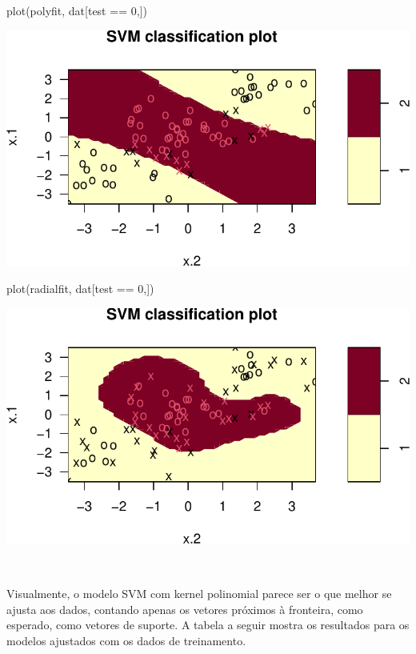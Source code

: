 \documentclass[
  a4paperpaper,
]{article}
\newenvironment{Shaded}{\begin{snugshade}}{\end{snugshade}}
\newcommand{\DecValTok}[1]{\textcolor[rgb]{0.68,0.00,0.00}{#1}}
\newcommand{\FunctionTok}[1]{\textcolor[rgb]{0.28,0.35,0.67}{#1}}
\newcommand{\NormalTok}[1]{\textcolor[rgb]{0.00,0.23,0.31}{#1}}
\newcommand{\SpecialCharTok}[1]{\textcolor[rgb]{0.37,0.37,0.37}{#1}}
\begin{document}
\begin{Shaded}
\begin{Highlighting}[]
\FunctionTok{plot}\NormalTok{(polyfit, dat[test }\SpecialCharTok{==} \DecValTok{0}\NormalTok{,])}
\end{Highlighting}
\end{Shaded}

\includegraphics{lista-5_files/figure-pdf/svmfit-2.pdf}

\begin{Shaded}
\begin{Highlighting}[]
\FunctionTok{plot}\NormalTok{(radialfit, dat[test }\SpecialCharTok{==} \DecValTok{0}\NormalTok{,])}
\end{Highlighting}
\end{Shaded}

\includegraphics{lista-5_files/figure-pdf/svmfit-3.pdf}

~

Visualmente, o modelo SVM com kernel polinomial parece ser o que melhor
se ajusta aos dados, contando apenas os vetores próximos à fronteira,
como esperado, como vetores de suporte. A tabela a seguir mostra os
resultados para os modelos ajustados com os dados de treinamento.
\end{document}
